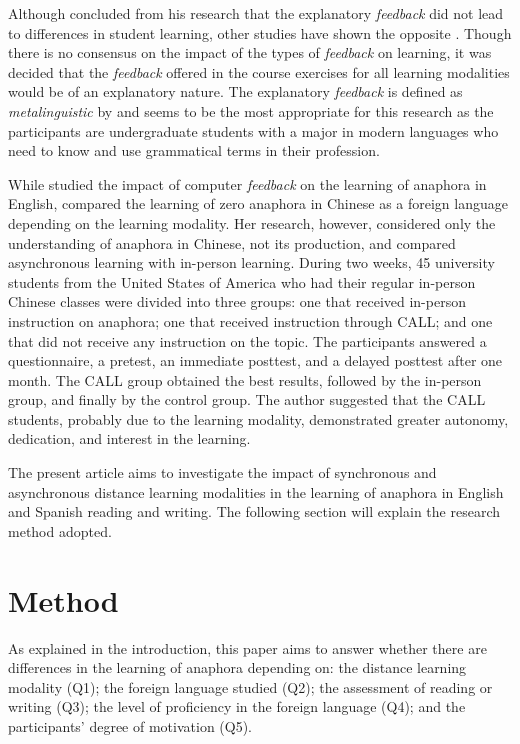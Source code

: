 \documentclass{textolivre}
\begin{document}
Although \textcite{liu_acquisition_2010} concluded from his research that the explanatory
\emph{feedback} did not lead to differences in student learning, other
studies have shown the opposite \cite{lyster_corrective_1997,heift_corrective_2004,mackey_pushing_2006}. 
Though there is no consensus on the impact of the
types of \emph{feedback} on learning, it was decided that the
\emph{feedback} offered in the course exercises for all learning
modalities would be of an explanatory nature. The explanatory
\emph{feedback} is defined as \emph{metalinguistic} by \textcite[p. 47]{lyster_corrective_1997}
and seems to be the most appropriate for this research as
the participants are undergraduate students with a major in modern
languages who need to know and use grammatical terms in their
profession.

While \textcite{liu_acquisition_2010} studied the impact of computer \emph{feedback} on the
learning of anaphora in English, \textcite{li_engaging_2014} compared the learning of zero
anaphora in Chinese as a foreign language depending on the learning
modality. Her research, however, considered only the understanding of
anaphora in Chinese, not its production, and compared asynchronous
learning with in-person learning. During two weeks, 45 university
students from the United States of America who had their regular
in-person Chinese classes were divided into three groups: one that
received in-person instruction on anaphora; one that received
instruction through CALL; and one that did not receive any instruction
on the topic. The participants answered a questionnaire, a pretest, an
immediate posttest, and a delayed posttest after one month. The CALL
group obtained the best results, followed by the in-person group, and
finally by the control group. The author suggested that the CALL
students, probably due to the learning modality, demonstrated greater
autonomy, dedication, and interest in the learning.

The present article aims to investigate the impact of synchronous and
asynchronous distance learning modalities in the learning of anaphora in
English and Spanish reading and writing. The following section will
explain the research method adopted.


\section{Method}\label{sec-method}
As explained in the introduction, this paper aims to answer whether
there are differences in the learning of anaphora depending on: the
distance learning modality (Q1); the foreign language studied (Q2); the
assessment of reading or writing (Q3); the level of proficiency in the
foreign language (Q4); and the participants' degree of motivation (Q5).
\end{document}
